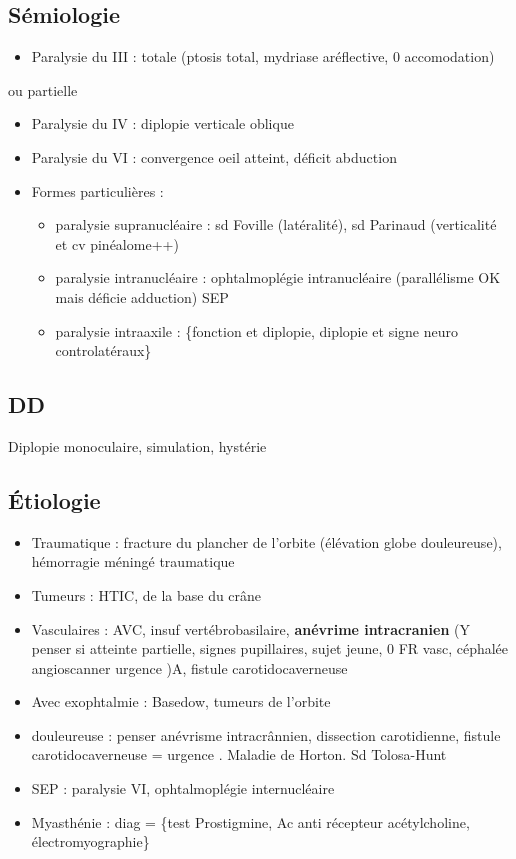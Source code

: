 \documentclass[11pt]{article}
\begin{document}
\subsection{Sémiologie}
\label{sec:org93b154b}
\begin{itemize}
\item Paralysie du III : totale (ptosis total, mydriase aréflective, 0 accomodation)
\end{itemize}
ou partielle
\begin{itemize}
\item Paralysie du IV : diplopie verticale oblique
\item Paralysie du VI : convergence oeil atteint, déficit abduction
\item Formes particulières :
\begin{itemize}
\item paralysie supranucléaire : sd Foville (latéralité), sd Parinaud (verticalité
et cv \thus pinéalome++)
\item paralysie intranucléaire : ophtalmoplégie intranucléaire (parallélisme OK mais
déficie adduction) \thus SEP
\item paralysie intraaxile : \{fonction et diplopie, diplopie et signe neuro
controlatéraux\}
\end{itemize}
\end{itemize}

\subsection{DD}
\label{sec:org78890ac}
Diplopie monoculaire, simulation, hystérie

\subsection{Étiologie}
\label{sec:org6d4476a}
\begin{itemize}
\item Traumatique : fracture du plancher de l'orbite (élévation globe douleureuse),
hémorragie méningé traumatique
\item Tumeurs : HTIC, de la base du crâne
\item Vasculaires : AVC, insuf vertébrobasilaire, \textbf{anévrime
intracranien} (Y penser si atteinte partielle, signes
pupillaires, sujet jeune, 0 FR vasc, céphalée \thus angioscanner urgence
\skull)A, fistule carotidocaverneuse
\item Avec exophtalmie : Basedow, tumeurs de l'orbite
\item douleureuse : penser anévrisme intracrânnien, dissection carotidienne, fistule
carotidocaverneuse = urgence \skull. Maladie de Horton. Sd Tolosa-Hunt
\item SEP : paralysie VI, ophtalmoplégie internucléaire
\item Myasthénie : diag = \{test Prostigmine, Ac anti récepteur acétylcholine, électromyographie\}
\end{itemize}
\end{document}
